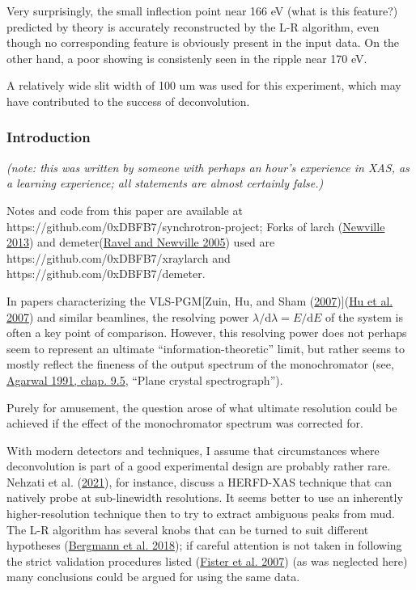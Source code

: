 \documentclass[
]{article}
\begin{document}
\pagebreak

Very surprisingly, the small inflection point near 166 eV (what is this
feature?) predicted by theory is accurately reconstructed by the L-R
algorithm, even though no corresponding feature is obviously present in
the input data. On the other hand, a poor showing is consistenly seen in
the ripple near 170 eV.

A relatively wide slit width of 100 um was used for this experiment,
which may have contributed to the success of deconvolution.

\hypertarget{introduction}{%
\subsubsection{Introduction}\label{introduction}}

\emph{(note: this was written by someone with perhaps an hour's
experience in XAS, as a learning experience; all statements are almost
certainly false.)}

Notes and code from this paper are available at
https://github.com/0xDBFB7/synchrotron-project; Forks of larch
(\protect\hyperlink{ref-Larch2013}{Newville 2013}) and
demeter(\protect\hyperlink{ref-ATHENA2005}{Ravel and Newville 2005})
used are https://github.com/0xDBFB7/xraylarch and
https://github.com/0xDBFB7/demeter.

In papers characterizing the VLS-PGM{[}Zuin, Hu, and Sham
(\protect\hyperlink{ref-zuin2007early}{2007}){]}(\protect\hyperlink{ref-VLSPGM2007a}{Hu
et al. 2007}) and similar beamlines, the resolving power
\(\lambda/\text{d}\lambda = E/\text{d}E\) of the system is often a key
point of comparison. However, this resolving power does not perhaps seem
to represent an ultimate ``information-theoretic'' limit, but rather
seems to mostly reflect the fineness of the output spectrum of the
monochromator (see, \protect\hyperlink{ref-XRay1991}{Agarwal 1991, chap.
9.5}, ``Plane crystal spectrograph'').

Purely for amusement, the question arose of what ultimate resolution
could be achieved if the effect of the monochromator spectrum was
corrected for.

With modern detectors and techniques, I assume that circumstances where
deconvolution is part of a good experimental design are probably rather
rare. Nehzati et al. (\protect\hyperlink{ref-High2021}{2021}), for
instance, discuss a HERFD-XAS technique that can natively probe at
sub-linewidth resolutions. It seems better to use an inherently
higher-resolution technique then to try to extract ambiguous peaks from
mud. The L-R algorithm has several knobs that can be turned to suit
different hypotheses (\protect\hyperlink{ref-Retraction2018}{Bergmann et
al. 2018}); if careful attention is not taken in following the strict
validation procedures listed
(\protect\hyperlink{ref-Deconvolving2007}{Fister et al. 2007}) (as was
neglected here) many conclusions could be argued for using the same
data.
\end{document}
